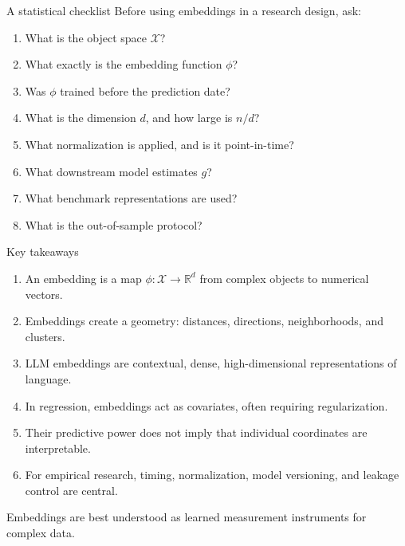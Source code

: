 \documentclass[aspectratio=169]{beamer}
\newcommand{\R}{\mathbb{R}}
\begin{document}
\begin{frame}{A statistical checklist}
\large
Before using embeddings in a research design, ask:

\vspace{0.2cm}

\begin{enumerate}
  \item What is the object space \(\mathcal{X}\)?
  \item What exactly is the embedding function \(\phi\)?
  \item Was \(\phi\) trained before the prediction date?
  \item What is the dimension \(d\), and how large is \(n/d\)?
  \item What normalization is applied, and is it point-in-time?
  \item What downstream model estimates \(g\)?
  \item What benchmark representations are used?
  \item What is the out-of-sample protocol?
\end{enumerate}
\end{frame}

\begin{frame}{Key takeaways}
\large
\begin{enumerate}
  \item An embedding is a map \(\phi : \mathcal{X} \to \R^d\) from complex objects to numerical vectors.
  \item Embeddings create a geometry: distances, directions, neighborhoods, and clusters.
  \item LLM embeddings are contextual, dense, high-dimensional representations of language.
  \item In regression, embeddings act as covariates, often requiring regularization.
  \item Their predictive power does not imply that individual coordinates are interpretable.
  \item For empirical research, timing, normalization, model versioning, and leakage control are central.
\end{enumerate}

\vspace{0.25cm}

\begin{greenbox}
Embeddings are best understood as learned measurement instruments for complex data.
\end{greenbox}
\end{frame}
\end{document}
